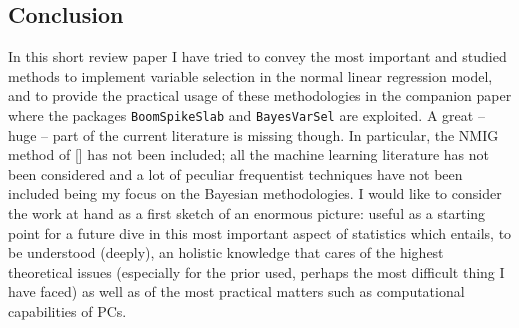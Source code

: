 \documentclass[11 pt]{article}
\begin{document}
\begin{multicols}{2}
\section{Conclusion}
In this short review paper I have tried to convey the most important and studied methods to implement variable selection in the normal linear regression model, and to provide the practical usage of these methodologies in the companion paper where the packages \texttt{BoomSpikeSlab} and \texttt{BayesVarSel} are exploited. A great -- huge -- part of the current literature is missing though. In particular, the NMIG method of [\cite{Ish2005}] has not been included; all the machine learning literature has not been considered and a lot of peculiar frequentist techniques have not been included being my focus on the Bayesian methodologies. I would like to consider the work at hand as a first sketch of an enormous picture: useful as a starting point for a future dive in this most important aspect of statistics which entails, to be understood (deeply), an holistic knowledge that cares of the highest theoretical issues (especially for the prior used, perhaps the most difficult thing I have faced) as well as of the most practical matters such as computational capabilities of PCs.
 




\end{multicols}
\end{document}

